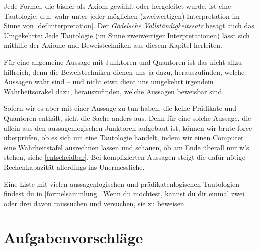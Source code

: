 \begin{vorschau}
    Jede Formel, die bisher als Axiom gewählt oder hergeleitet wurde, ist eine Tautologie, d.h. wahr unter jeder möglichen (zweiwertigen) Interpretation im Sinne von \cref{def:interpretation}. Der \emph{Gödelsche Vollständigkeitssatz} besagt auch das Umgekehrte: Jede Tautologie (im Sinne zweiwertiger Interpretationen) lässt sich mithilfe der Axiome und Beweistechniken aus diesem Kapitel herleiten.
    
    Für eine allgemeine Aussage mit Junktoren und Quantoren ist das nicht allzu hilfreich, denn die Beweistechniken dienen uns ja dazu, herauszufinden, welche Aussagen wahr sind -- und nicht etwa dient uns umgekehrt irgendein Wahrheitsorakel dazu, herauszufinden, welche Aussagen beweisbar sind.
    
    Sofern wir es aber mit einer Aussage zu tun haben, die keine Prädikate und Quantoren enthält, sieht die Sache anders aus. Denn für eine solche Aussage, die allein aus den aussagenlogischen Junktoren aufgebaut ist, können wir brute force überprüfen, ob es sich um eine Tautologie handelt, indem wir einen Computer eine Wahrheitstafel ausrechnen lassen und schauen, ob am Ende überall nur w's stehen, siehe \cref{entscheidbar}. Bei komplizierten Aussagen steigt die dafür nötige Rechenkapazität allerdings ins Unermessliche.
\end{vorschau}


\begin{bem}
    Eine Liste mit vielen aussagenlogischen und prädikatenlogischen Tautologien findest du in \cref{formelsammlung}. Wenn du möchtest, kannst du dir einmal zwei oder drei davon raussuchen und versuchen, sie zu beweisen.
\end{bem}





\clearpage
\section{Aufgabenvorschläge}



